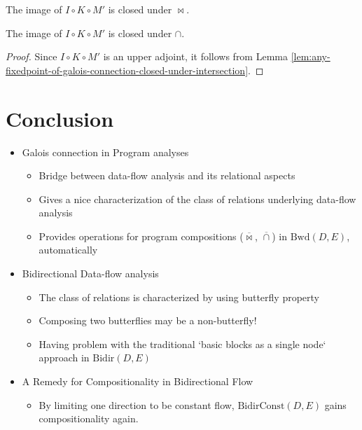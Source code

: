 \documentclass{llncs}
\newcommand{\Bidir}{\mathrm{Bidir}}
\newcommand{\Unidir}{\mathrm{Bwd}}
\newcommand{\UnidirConst}{\mathrm{BidirConst}}
\newcommand{\comp}{\circ}
\newcommand{\bowtielift}{\mathbin{\overline{\bowtie}}}
\newcommand{\caplift}{\mathbin{\overline{\cap}}}
\begin{document}
 \begin{proposition}\label{prop:bwdconst-closed-under-composition}
    The image of $I \comp K \comp M'$ is closed under $\bowtie$.
  \end{proposition}
  \begin{proposition}\label{prop:bwdconst-closed-under-intersection}
    The image of $I \comp K \comp M'$ is closed under $\cap$.
    \begin{proof}
      Since $I \comp K \comp M'$ is an upper adjoint, it follows from Lemma \ref{lem:any-fixedpoint-of-galois-connection-closed-under-intersection}.
    \end{proof}
  \end{proposition}

\section{Conclusion}

\begin{itemize}
    \item Galois connection in Program analyses
    \begin{itemize}
      \item Bridge between data-flow analysis and its relational aspects
      \item Gives a nice characterization of the class of relations underlying data-flow analysis
      \item Provides operations for program compositions ($\bowtielift$, $\caplift$) in $\Unidir(D, E)$, automatically
    \end{itemize}
    \item Bidirectional Data-flow analysis
    \begin{itemize}
      \item The class of relations is characterized by using butterfly property
      \item Composing two butterflies may be a non-butterfly!
      \item Having problem with the traditional `basic blocks as a single node` approach in $\Bidir(D, E)$
    \end{itemize}
    \item A Remedy for Compositionality in Bidirectional Flow
    \begin{itemize}
      \item By limiting one direction to be constant flow, $\UnidirConst(D, E)$ gains compositionality again.
    \end{itemize}
  \end{itemize}
\end{document}
